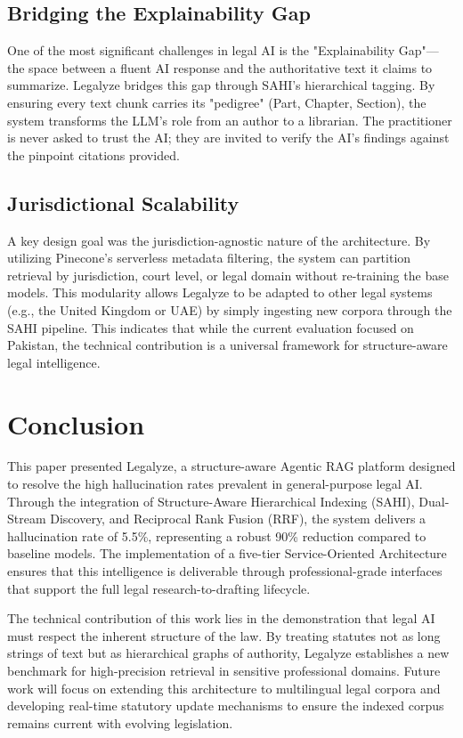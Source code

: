 \documentclass[a4paper,fleqn]{cas-dc}
\begin{document}
\subsection{Bridging the Explainability Gap}
One of the most significant challenges in legal AI is the "Explainability Gap"—the space between a fluent AI response and the authoritative text it claims to summarize. Legalyze bridges this gap through SAHI’s hierarchical tagging. By ensuring every text chunk carries its "pedigree" (Part, Chapter, Section), the system transforms the LLM's role from an author to a librarian. The practitioner is never asked to trust the AI; they are invited to verify the AI's findings against the pinpoint citations provided.

\subsection{Jurisdictional Scalability}
A key design goal was the jurisdiction-agnostic nature of the architecture. By utilizing Pinecone's serverless metadata filtering, the system can partition retrieval by jurisdiction, court level, or legal domain without re-training the base models. This modularity allows Legalyze to be adapted to other legal systems (e.g., the United Kingdom or UAE) by simply ingesting new corpora through the SAHI pipeline. This indicates that while the current evaluation focused on Pakistan, the technical contribution is a universal framework for structure-aware legal intelligence.

\section{Conclusion}
This paper presented Legalyze, a structure-aware Agentic RAG platform designed to resolve the high hallucination rates prevalent in general-purpose legal AI. Through the integration of Structure-Aware Hierarchical Indexing (SAHI), Dual-Stream Discovery, and Reciprocal Rank Fusion (RRF), the system delivers a hallucination rate of 5.5\%, representing a robust 90\% reduction compared to baseline models. The implementation of a five-tier Service-Oriented Architecture ensures that this intelligence is deliverable through professional-grade interfaces that support the full legal research-to-drafting lifecycle.

The technical contribution of this work lies in the demonstration that legal AI must respect the inherent structure of the law. By treating statutes not as long strings of text but as hierarchical graphs of authority, Legalyze establishes a new benchmark for high-precision retrieval in sensitive professional domains. Future work will focus on extending this architecture to multilingual legal corpora and developing real-time statutory update mechanisms to ensure the indexed corpus remains current with evolving legislation.
\end{document}
